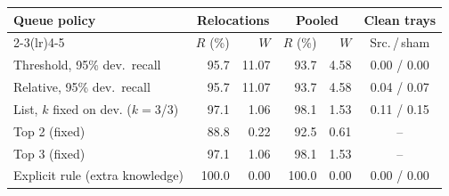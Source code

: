 \begin{tabular}{lrrrrc}
\toprule
Queue policy & \multicolumn{2}{c}{Relocations} & \multicolumn{2}{c}{Pooled} & Clean trays \\
\cmidrule(lr){2-3}\cmidrule(lr){4-5}
 & $R$ (\%) & $W$ & $R$ (\%) & $W$ & Src.\,/\,sham \\
\midrule
Threshold, 95\% dev.\ recall & 95.7 & 11.07 & 93.7 & 4.58 & 0.00 / 0.00 \\
Relative, 95\% dev.\ recall & 95.7 & 11.07 & 93.7 & 4.58 & 0.04 / 0.07 \\
List, $k$ fixed on dev. ($k{=}3$/3) & 97.1 & 1.06 & 98.1 & 1.53 & 0.11 / 0.15 \\
Top 2 (fixed) & 88.8 & 0.22 & 92.5 & 0.61 & -- \\
Top 3 (fixed) & 97.1 & 1.06 & 98.1 & 1.53 & -- \\
\midrule
Explicit rule (extra knowledge) & 100.0 & 0.00 & 100.0 & 0.00 & 0.00 / 0.00 \\
\bottomrule
\end{tabular}
